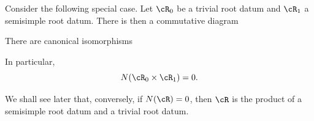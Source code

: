 Consider the following special case. Let \(\cR_0\) be a trivial root
datum and \(\cR_1\) a semisimple root datum. There is then a commutative
diagram
\begin{center}
\end{center}

\begin{lemma}\label{sga3:XXI:6.4.4}
There are canonical isomorphisms
\begin{center}
\end{center}
In particular,
\[
 N(\cR_0\times\cR_1)=0.
\]
\end{lemma}

We shall see later that, conversely, if \(N(\cR)=0\), then \(\cR\) is
the product of a semisimple root datum and a trivial root datum.
